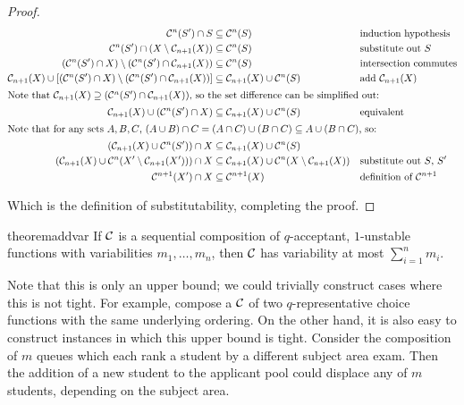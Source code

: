 \begin{proof}
    \begin{align*}
        \mathcal{C}^n(S') \cap S & \subseteq \mathcal{C}^n(S) && \text{induction hypothesis} \\
        \mathcal{C}^n(S') \cap \left(X \setminus \mathcal{C}_{n+1}(X)\right) & \subseteq \mathcal{C}^n(S) &&  \text{substitute out $S$}\\      \left(\mathcal{C}^n(S') \cap X\right) \setminus \left(\mathcal{C}^n(S') \cap  \mathcal{C}_{n+1}(X)\right) & \subseteq \mathcal{C}^n(S) && \text{intersection commutes}\\
        \mathcal{C}_{n+1}(X) \cup \left[\left(\mathcal{C}^n(S') \cap X\right) \setminus \left(\mathcal{C}^n(S') \cap  \mathcal{C}_{n+1}(X)\right)\right] & \subseteq \mathcal{C}_{n+1}(X) \cup \mathcal{C}^n(S) && \text{add $\mathcal{C}_{n+1}(X)$} \\ \intertext{Note that $\mathcal{C}_{n+1}(X) \supseteq\left(\mathcal{C}^n(S') \cap  \mathcal{C}_{n+1}(X)\right)$, so the set difference can be simplified out:}
        \mathcal{C}_{n+1}(X) \cup \left(\mathcal{C}^n(S') \cap X\right) & \subseteq \mathcal{C}_{n+1}(X) \cup \mathcal{C}^n(S) && \text{equivalent} \\ \intertext{Note that for any sets $A,B,C$, $(A \cup B) \cap C = (A \cap C)\cup (B \cap C) \subseteq A \cup (B \cap C)$, so:
        }
        \left(\mathcal{C}_{n+1}(X) \cup \mathcal{C}^n(S') \right) \cap X & \subseteq \mathcal{C}_{n+1}(X) \cup \mathcal{C}^n(S) && \text{} \\
        \left(\mathcal{C}_{n+1}(X) \cup \mathcal{C}^n(X' \setminus \mathcal{C}_{n+1}(X')) \right) \cap X & \subseteq \mathcal{C}_{n+1}(X) \cup \mathcal{C}^n(X \setminus \mathcal{C}_{n+1}(X)) &&  \text{substitute out $S$, $S'$}  \\
        \mathcal{C}^{n+1}(X') \cap X & \subseteq \mathcal{C}^{n+1}(X) &&  \text{definition of $\mathcal{C}^{n+1}$}
    \end{align*}

    Which is the definition of substitutability, completing the proof.
\end{proof}

\begin{restatable}{theorem}{addvar}
\label{thm:additive-variability}
If $\mathcal{C}$ is a sequential composition of $q$-acceptant, $1$-unstable functions with variabilities $m_1, \ldots, m_n$, then $\mathcal{C}$ has variability at most $\sum_{i=1}^n m_i$.
\end{restatable}

Note that this is only an upper bound; we could trivially construct cases where this is not tight. For example, compose a $\mathcal{C}$ of two $q$-representative choice functions with the same underlying ordering. On the other hand, it is also easy to construct instances in which this upper bound is tight. Consider the composition of $m$ queues which each rank a student by a different subject area exam. Then the addition of a new student to the applicant pool could displace any of $m$ students, depending on the subject area.


